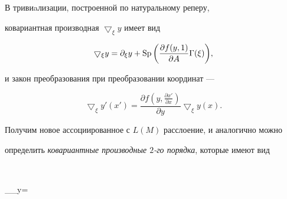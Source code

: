 




\begin{thm}


В тривиaлизации, построенной по натуральному реперу,


ковариантная производная $\bigtriangledown_\xi y$ имеет вид


$$


\bigtriangledown_\xi y=\partial_\xi y+


\SP\bigg( \frac{\partial f(y,1)}{\partial A}


\Gamma(\xi)\bigg),


$$


и закон преобразования при преобразовании координат ---


$$


\bigtriangledown_\xi y'(x')=


\frac{\partial f(y,\frac{\partial x'}{\partial x})}{\partial y}


\bigtriangledown_\xi y(x).


$$


\end{thm}





Получим новое ассоциированное с $L(M)$ расслоение, и аналогично можно 


определить {\it ковариантные производные $2$-го порядка}, которые имеют вид


$$


\bigtriangledown_\eta\bigtriangledown_\xi\wt y=



